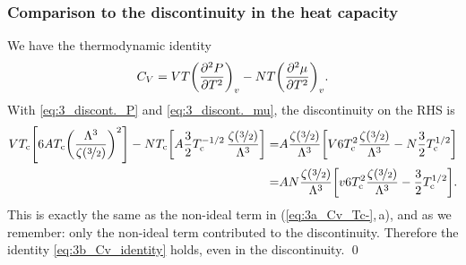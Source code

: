 \documentclass[11pt,letter, swedish, english
]{article}
\begin{document}
\subsubsection{Comparison to the discontinuity in the heat capacity}
We have the thermodynamic identity
\begin{equation}\label{eq:3b_Cv_identity}
C_V=VT\qty(\pdv[2]{P}{T})_v-NT\qty(\pdv[2]{\mu}{T})_v.
\end{equation}
With \eqref{eq:3_discont._P} and \eqref{eq:3_discont._mu}, the
discontinuity on the RHS is
\begin{equation}
\begin{aligned}
VT_{\text{c}}\qty[6AT_{\text{c}}\qty(\frac{\Lambda^3}{\zeta(\nicefrac{3}{2})})^2]
-NT_{\text{c}}\qty[A\frac{3}{2}
T_{\text{c}}^{-1/2}\,\frac{\zeta(\nicefrac{3}{2})}{\Lambda^3}]
=&A\frac{\zeta(\nicefrac{3}{2})}{\Lambda^3}
\qty[V6T_{\text{c}}^2\frac{\zeta(\nicefrac{3}{2})}{\Lambda^3}
-N\frac{3}{2}T_{\text{c}}^{1/2}]\\
=&AN\frac{\zeta(\nicefrac{3}{2})}{\Lambda^3}
\qty[v6T_{\text{c}}^2\frac{\zeta(\nicefrac{3}{2})}{\Lambda^3}
-\frac{3}{2}T_{\text{c}}^{1/2}].
\end{aligned}
\end{equation}
This is exactly the same as the non-ideal term in
(\ref{eq:3a_Cv_Tc-},\,a), and as we remember: only the non-ideal term
contributed to the discontinuity. Therefore the identity
\eqref{eq:3b_Cv_identity} holds, even in the discontinuity.
\qed
\end{document}
